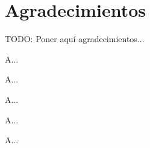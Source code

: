 \chapter*{Agradecimientos}

\thispagestyle{empty}

   \vspace{1cm}

TODO: Poner aquí agradecimientos...
   
   \vspace{1cm}
   
A...

   \vspace{1cm}

A...

   \vspace{1cm}
   
A...
   
   \vspace{1cm}

A...

   \vspace{1cm}

A...
